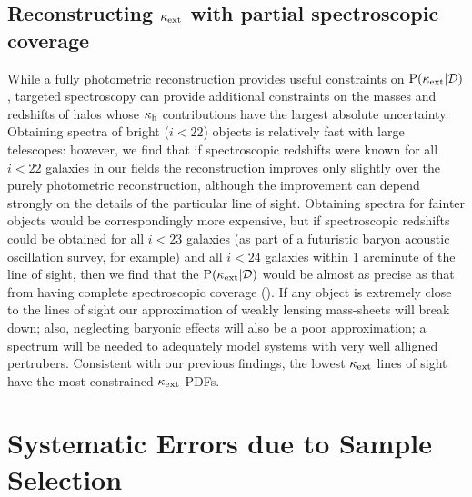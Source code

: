 \documentclass[useAMS,usenatbib,a4paper]{mn2e}
\begin{document}

\subsection{Reconstructing $\kappa_{\rm ext}$ with partial spectroscopic coverage}
\label{sec:obsMstar+z:targetedspec}

While a fully photometric reconstruction provides useful constraints on
${\rm P}(\kappa_{\rm ext}|{\mathcal{D}})$, targeted spectroscopy can provide additional constraints
on the masses and redshifts of halos whose $\kappa_{\rm h}$ contributions have the
largest absolute uncertainty. Obtaining spectra of bright ($i<22$) objects is
relatively fast with large telescopes: however, we find that if spectroscopic
redshifts were known for all $i<22$ galaxies in our fields the reconstruction
improves only slightly over the purely photometric reconstruction,  although
the improvement can depend strongly on the details of the particular line of
sight. Obtaining spectra for fainter objects would be correspondingly more
expensive, but if spectroscopic redshifts could be obtained for all $i<23$
galaxies (as part of a futuristic baryon acoustic oscillation survey, for
example) and all $i<24$ galaxies within 1 arcminute of the line of sight, then
we find that the ${\rm P}(\kappa_{\rm ext}|{\mathcal{D}})$ would be almost as precise as that from
having complete spectroscopic coverage (). If any object is
extremely close to the lines of sight our approximation of weakly lensing
mass-sheets will break down; also, neglecting baryonic effects will also be a poor
approximation; a spectrum will be needed
to adequately model systems with very well alligned pertrubers.
Consistent with our previous findings, the lowest $\kappa_{\rm ext}$ lines of
sight have the most constrained $\kappa_{\rm ext}$ PDFs.



\section{Systematic Errors due to Sample Selection}
\label{sec:biases}
\end{document}
